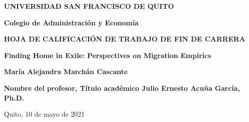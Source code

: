 \documentclass[../main.tex]{subfiles}
\begin{document}
\centering
{\Large \textbf{UNIVERSIDAD SAN FRANCISCO DE QUITO}}

\vspace{1cm} 
{\large \textbf{Colegio de Administración y Economía}}

\vspace{2.5cm}
{\large \textbf{HOJA DE CALIFICACIÓN DE TRABAJO DE FIN DE CARRERA}}

\vspace{2.5cm}
{\large \textbf{Finding Home in Exile: Perspectives on Migration Empirics}}

\vspace{1cm}
{\Large \textbf{María Alejandra Marchán Cascante}}

\vspace{4cm}
\flushleft
\textbf{Nombre del profesor, Título académico \hfill{Julio Ernesto Acuña García, Ph.D.}}

\vspace{4cm}
\begin{center}
Quito, 10 de mayo de 2021
\end{center}
\end{document}

